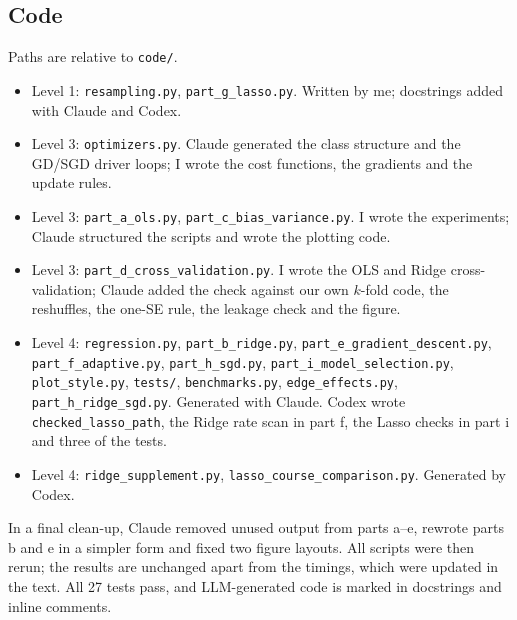\documentclass[aps,prb,reprint,superscriptaddress,nofootinbib,longbibliography,floatfix]{revtex4-2}
\begin{document}
\subsection{Code}
Paths are relative to \texttt{code/}.
\begin{itemize}
\item Level 1: \texttt{resampling.py}, \texttt{part\_g\_lasso.py}. Written by me; docstrings added with Claude and Codex.
\item Level 3: \texttt{optimizers.py}. Claude generated the class structure and the GD/SGD driver loops; I wrote the cost functions, the gradients and the update rules.
\item Level 3: \texttt{part\_a\_ols.py}, \texttt{part\_c\_bias\_variance.py}. I wrote the experiments; Claude structured the scripts and wrote the plotting code.
\item Level 3: \texttt{part\_d\_cross\_validation.py}. I wrote the OLS and Ridge cross-validation; Claude added the check against our own $k$-fold code, the reshuffles, the one-SE rule, the leakage check and the figure.
\item Level 4: \texttt{regression.py}, \texttt{part\_b\_ridge.py}, \texttt{part\_e\_gradient\_descent.py}, \texttt{part\_f\_adaptive.py}, \texttt{part\_h\_sgd.py}, \texttt{part\_i\_model\_selection.py}, \texttt{plot\_style.py}, \texttt{tests/}, \texttt{benchmarks.py}, \texttt{edge\_effects.py}, \texttt{part\_h\_ridge\_sgd.py}. Generated with Claude. Codex wrote \texttt{checked\_lasso\_path}, the Ridge rate scan in part f, the Lasso checks in part i and three of the tests.
\item Level 4: \texttt{ridge\_supplement.py}, \texttt{lasso\_course\_comparison.py}. Generated by Codex.
\end{itemize}
In a final clean-up, Claude removed unused output from parts a--e, rewrote parts b and e in a simpler form and fixed two figure layouts. All scripts were then rerun; the results are unchanged apart from the timings, which were updated in the text. All 27 tests pass, and LLM-generated code is marked in docstrings and inline comments.




\end{document}
